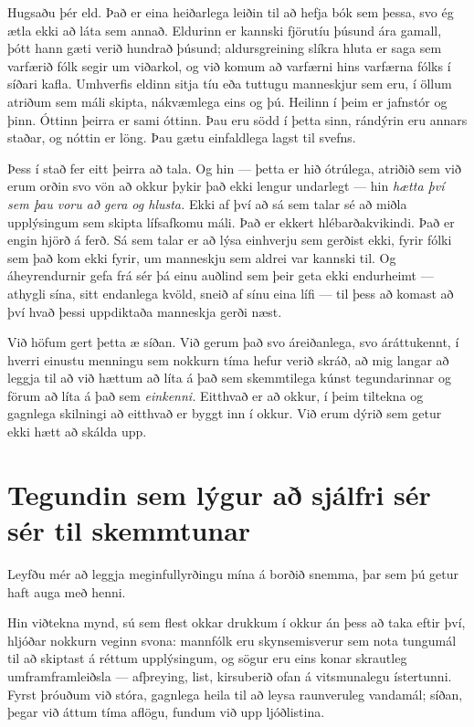 Hugsaðu þér eld. Það er eina heiðarlega leiðin til að hefja bók sem þessa, svo ég ætla ekki að láta sem annað. Eldurinn er kannski fjörutíu þúsund ára gamall, þótt hann gæti verið hundrað þúsund; aldursgreining slíkra hluta er saga sem varfærið fólk segir um viðarkol, og við komum að varfærni hins varfærna fólks í síðari kafla. Umhverfis eldinn sitja tíu eða tuttugu manneskjur sem eru, í öllum atriðum sem máli skipta, nákvæmlega eins og þú. Heilinn í þeim er jafnstór og þinn. Óttinn þeirra er sami óttinn. Þau eru södd í þetta sinn, rándýrin eru annars staðar, og nóttin er löng. Þau gætu einfaldlega lagst til svefns.

Þess í stað fer eitt þeirra að tala. Og hin — þetta er hið ótrúlega, atriðið sem við erum orðin svo vön að okkur þykir það ekki lengur undarlegt — hin \emph{hætta því sem þau voru að gera og hlusta.} Ekki af því að sá sem talar sé að miðla upplýsingum sem skipta lífsafkomu máli. Það er ekkert hlébarðakvikindi. Það er engin hjörð á ferð. Sá sem talar er að lýsa einhverju sem gerðist ekki, fyrir fólki sem það kom ekki fyrir, um manneskju sem aldrei var kannski til. Og áheyrendurnir gefa frá sér þá einu auðlind sem þeir geta ekki endurheimt — athygli sína, sitt endanlega kvöld, sneið af sínu eina lífi — til þess að komast að því hvað þessi uppdiktaða manneskja gerði næst.

Við höfum gert þetta æ síðan. Við gerum það svo áreiðanlega, svo áráttukennt, í hverri einustu menningu sem nokkurn tíma hefur verið skráð, að mig langar að leggja til að við hættum að líta á það sem skemmtilega kúnst tegundarinnar og förum að líta á það sem \emph{einkenni.} Eitthvað er að okkur, í þeim tiltekna og gagnlega skilningi að eitthvað er byggt inn í okkur. Við erum dýrið sem getur ekki hætt að skálda upp.

\section*{Tegundin sem lýgur að sjálfri sér sér til skemmtunar}

Leyfðu mér að leggja meginfullyrðingu mína á borðið snemma, þar sem þú getur haft auga með henni.

Hin viðtekna mynd, sú sem flest okkar drukkum í okkur án þess að taka eftir því, hljóðar nokkurn veginn svona: mannfólk eru skynsemisverur sem nota tungumál til að skiptast á réttum upplýsingum, og sögur eru eins konar skrautleg umframframleiðsla — afþreying, list, kirsuberið ofan á vitsmunalegu ístertunni. Fyrst þróuðum við stóra, gagnlega heila til að leysa raunveruleg vandamál; síðan, þegar við áttum tíma aflögu, fundum við upp ljóðlistina.

